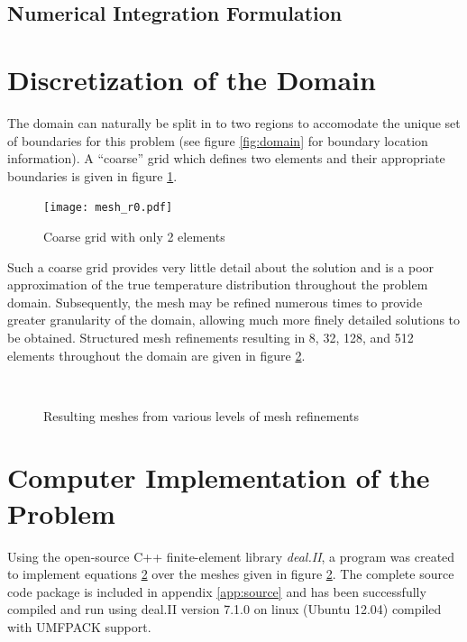\documentclass[letterpaper,10pt]{article}
\begin{document}
\subsection{Numerical Integration Formulation}

\section{Discretization of the Domain}
The domain can naturally be split in to two regions to accomodate the unique set of boundaries for this problem (see figure \ref{fig:domain} for boundary location information). A ``coarse'' grid which defines two elements and their appropriate boundaries is given in figure \ref{fig:grid_r0}.

\begin{figure}[H]
	\centering
	\texttt{[image: mesh\_r0.pdf]}
	\caption{Coarse grid with only 2 elements}
	\label{fig:grid_r0}
\end{figure}

Such a coarse grid provides very little detail about the solution and is a poor approximation of the true temperature distribution throughout the problem domain. Subsequently, the mesh may be refined numerous times to provide greater granularity of the domain, allowing much more finely detailed solutions to be obtained. Structured mesh refinements resulting in 8, 32, 128, and 512 elements throughout the domain are given in figure \ref{fig:meshs}.

\begin{figure}[H]
	\centering
	 \;
	 \\
	 \;
	\caption{Resulting meshes from various levels of mesh refinements}
	\label{fig:meshs}
\end{figure}

\section{Computer Implementation of the Problem}
Using the open-source C++ finite-element library \emph{deal.II}, a program was created to implement equations \ref{} over the meshes given in figure \ref{fig:meshs}. The complete source code package is included in appendix \ref{app:source} and has been successfully compiled and run using deal.II version 7.1.0 on linux (Ubuntu 12.04) compiled with UMFPACK support.
\end{document}
